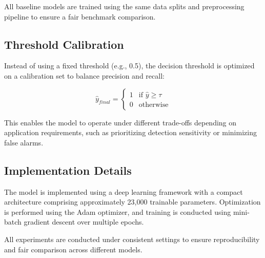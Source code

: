 All baseline models are trained using the same data splits and preprocessing
pipeline to ensure a fair benchmark comparison.

\subsection{Threshold Calibration}

Instead of using a fixed threshold (e.g., 0.5), the decision threshold is
optimized on a calibration set to balance precision and recall:

\begin{equation}
\hat{y}_{final} =
\begin{cases}
1 & \text{if } \hat{y} \geq \tau \\
0 & \text{otherwise}
\end{cases}
\end{equation}

This enables the model to operate under different trade-offs depending on
application requirements, such as prioritizing detection sensitivity or
minimizing false alarms.

\subsection{Implementation Details}

The model is implemented using a deep learning framework with a compact
architecture comprising approximately 23{,}000 trainable parameters.
Optimization is performed using the Adam optimizer, and training is conducted
using mini-batch gradient descent over multiple epochs.

All experiments are conducted under consistent settings to ensure reproducibility
and fair comparison across different models.